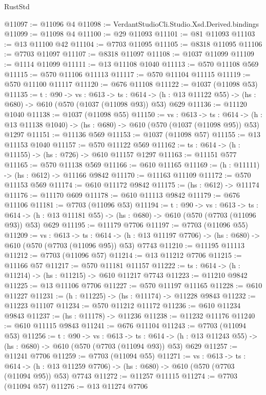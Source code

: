 \begin{lexlean}{RustStd}
\begin{coremodule}
@11097 := @11096 @4
@11098 := VerdantStudioCli.Studio.Xsd.Derived.bindings
@11099 := @11098 @4
@11100 := @29 @11093
@11101 := @81 @11093
@11103 := @13 @11100 @42
@11104 := @7703 @11095
@11105 := @8318 @11095
@11106 := @7703 @11097
@11107 := @8318 @11097
@11108 := @1037 @11099
@11109 := @1114 @11099
@11111 := @13 @11108 @1040
@11113 := @570 @11108 @569
@11115 := @570 @11106 @11113
@11117 := @570 @11104 @11115
@11119 := @570 @11100 @11117
@11120 := @676 @11108
@11122 := @1037 (@11098 @53)
@11135 := {t : @90} ->
  {vs : @613} ->
  {ts : @614} -> (h : @13 @11122 @55) -> (hs : @680) -> @610 (@570 (@1037 (@11098 @93)) @53) @629
@11136 := @11120 @1040
@11138 := @1037 (@11098 @55)
@11150 := {vs : @613} ->
  {ts : @614} -> (h : @13 @11138 @1040) -> (hs : @680) -> @610 (@570 (@1037 (@11098 @95)) @53) @1297
@11151 := @11136 @569
@11153 := @1037 (@11098 @57)
@11155 := @13 @11153 @1040
@11157 := @570 @11122 @569
@11162 := {ts : @614} -> (h : @11155) -> (hs : @726) -> @610 @11157 @1297
@11163 := @11151 @577
@11165 := @570 @11138 @569
@11166 := @610 @11165
@11169 := (h : @11111) -> (hs : @612) -> @11166 @9842
@11170 := @11163 @11109
@11172 := @570 @11153 @569
@11174 := @610 @11172 @9842
@11175 := (hs : @612) -> @11174
@11176 := @11170 @609
@11178 := @610 @11113 @9842
@11179 := @676 @11106
@11181 := @7703 (@11096 @53)
@11194 := {t : @90} ->
  {vs : @613} ->
  {ts : @614} -> (h : @13 @11181 @55) -> (hs : @680) -> @610 (@570 (@7703 (@11096 @93)) @53) @629
@11195 := @11179 @7706
@11197 := @7703 (@11096 @55)
@11209 := {vs : @613} ->
  {ts : @614} -> (h : @13 @11197 @7706) -> (hs : @680) -> @610 (@570 (@7703 (@11096 @95)) @53) @7743
@11210 := @11195 @11113
@11212 := @7703 (@11096 @57)
@11214 := @13 @11212 @7706
@11215 := @11166 @57
@11217 := @570 @11181 @11157
@11222 := {ts : @614} -> (h : @11214) -> (hs : @11215) -> @610 @11217 @7743
@11223 := @11210 @9842
@11225 := @13 @11106 @7706
@11227 := @570 @11197 @11165
@11228 := @610 @11227
@11231 := (h : @11225) -> (hs : @11174) -> @11228 @9843
@11232 := @11223 @11107
@11234 := @570 @11212 @11172
@11236 := @610 @11234 @9843
@11237 := (hs : @11178) -> @11236
@11238 := @11232 @11176
@11240 := @610 @11115 @9843
@11241 := @676 @11104
@11243 := @7703 (@11094 @53)
@11256 := {t : @90} ->
  {vs : @613} ->
  {ts : @614} -> (h : @13 @11243 @55) -> (hs : @680) -> @610 (@570 (@7703 (@11094 @93)) @53) @629
@11257 := @11241 @7706
@11259 := @7703 (@11094 @55)
@11271 := {vs : @613} ->
  {ts : @614} -> (h : @13 @11259 @7706) -> (hs : @680) -> @610 (@570 (@7703 (@11094 @95)) @53) @7743
@11272 := @11257 @11115
@11274 := @7703 (@11094 @57)
@11276 := @13 @11274 @7706

\end{coremodule}
\end{lexlean}
